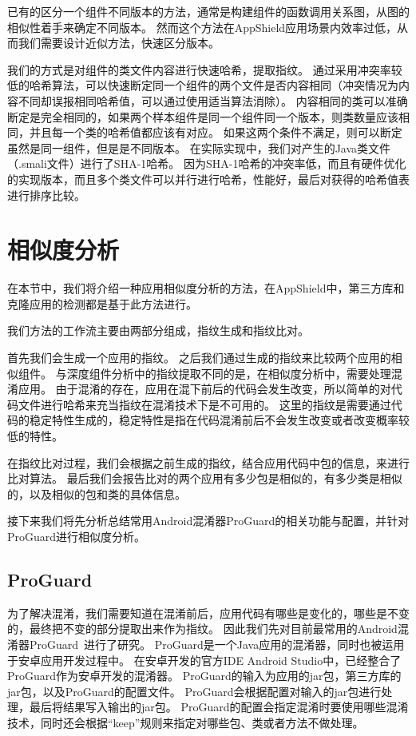 已有的区分一个组件不同版本的方法，通常是构建组件的函数调用关系图，从图的相似性着手来确定不同版本。
然而这个方法在AppShield应用场景内效率过低，从而我们需要设计近似方法，快速区分版本。

我们的方式是对组件的类文件内容进行快速哈希，提取指纹。
通过采用冲突率较低的哈希算法，可以快速断定同一个组件的两个文件是否内容相同（冲突情况为内容不同却误报相同哈希值，可以通过使用适当算法消除）。
内容相同的类可以准确断定是完全相同的，如果两个样本组件是同一个组件同一个版本，则类数量应该相同，并且每一个类的哈希值都应该有对应。
如果这两个条件不满足，则可以断定虽然是同一组件，但是是不同版本。
在实际实现中，我们对产生的Java类文件（.smali文件）进行了SHA-1哈希。
因为SHA-1哈希的冲突率低，而且有硬件优化的实现版本，而且多个类文件可以并行进行哈希，性能好，最后对获得的哈希值表进行排序比较。

\section{相似度分析}
\label{sec:appshield:sim-analysis}

在本节中，我们将介绍一种应用相似度分析的方法，在AppShield中，第三方库和克隆应用的检测都是基于此方法进行。

我们方法的工作流主要由两部分组成，指纹生成和指纹比对。

首先我们会生成一个应用的指纹。
之后我们通过生成的指纹来比较两个应用的相似组件。
与深度组件分析中的指纹提取不同的是，在相似度分析中，需要处理混淆应用。
由于混淆的存在，应用在混下前后的代码会发生改变，所以简单的对代码文件进行哈希来充当指纹在混淆技术下是不可用的。
这里的指纹是需要通过代码的稳定特性生成的，稳定特性是指在代码混淆前后不会发生改变或者改变概率较低的特性。

在指纹比对过程，我们会根据之前生成的指纹，结合应用代码中包的信息，来进行比对算法。
最后我们会报告比对的两个应用有多少包是相似的，有多少类是相似的，以及相似的包和类的具体信息。

接下来我们将先分析总结常用Android混淆器ProGuard的相关功能与配置，并针对ProGuard进行相似度分析。

\subsection{ProGuard}
\label{sec:appshield:proguard}

为了解决混淆，我们需要知道在混淆前后，应用代码有哪些是变化的，哪些是不变的，最终把不变的部分提取出来作为指纹。
因此我们先对目前最常用的Android混淆器ProGuard~\supercite{proguard}进行了研究。
ProGuard是一个Java应用的混淆器，同时也被运用于安卓应用开发过程中。
在安卓开发的官方IDE Android Studio中，已经整合了ProGuard作为安卓开发的混淆器。
ProGuard的输入为应用的jar包，第三方库的jar包，以及ProGuard的配置文件。
ProGuard会根据配置对输入的jar包进行处理，最后将结果写入输出的jar包。
ProGuard的配置会指定混淆时要使用哪些混淆技术，同时还会根据“keep”规则来指定对哪些包、类或者方法不做处理。

